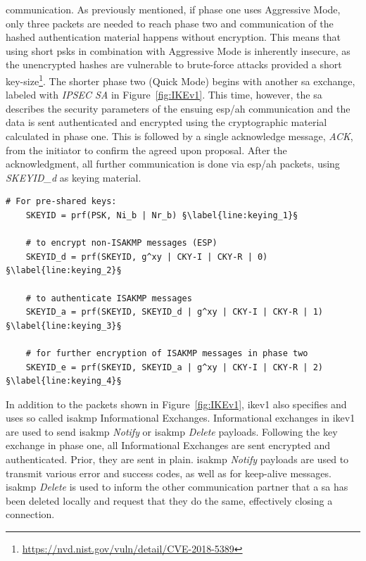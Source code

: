 communication. As previously mentioned, if phase one uses Aggressive Mode, only three packets are needed to reach phase two and communication of the hashed authentication material happens without encryption. This means that using short \acp{psk} in combination with Aggressive Mode is inherently insecure, as the unencrypted hashes are vulnerable to brute-force attacks provided a short key-size\footnote{\url{https://nvd.nist.gov/vuln/detail/CVE-2018-5389}}. The shorter phase two (Quick Mode) begins with another \ac{sa} exchange, labeled with \emph{IPSEC SA} in Figure~\ref{fig:IKEv1}. This time, however, the \ac{sa} describes the security parameters of the ensuing \ac{esp}/\ac{ah} communication and the data is sent authenticated and encrypted using the cryptographic material calculated in phase one. This is followed by a single acknowledge message, \emph{ACK}, from the initiator to confirm the agreed upon proposal. After the acknowledgment, all further communication is done via \ac{esp}/\ac{ah} packets, using \emph{SKEYID\_d} as keying material. \\

\begin{lstlisting}[float=ht, caption=IKE keying material construction., label=lst:keying, escapechar=§]
	# For pre-shared keys: 
	SKEYID = prf(PSK, Ni_b | Nr_b) §\label{line:keying_1}§
	
	# to encrypt non-ISAKMP messages (ESP)
	SKEYID_d = prf(SKEYID, g^xy | CKY-I | CKY-R | 0) §\label{line:keying_2}§
	
	# to authenticate ISAKMP messages
	SKEYID_a = prf(SKEYID, SKEYID_d | g^xy | CKY-I | CKY-R | 1) §\label{line:keying_3}§
	
	# for further encryption of ISAKMP messages in phase two
	SKEYID_e = prf(SKEYID, SKEYID_a | g^xy | CKY-I | CKY-R | 2) §\label{line:keying_4}§
\end{lstlisting}

\newpage
In addition to the packets shown in Figure~\ref{fig:IKEv1}, \ac{ike}v1 also specifies and uses so called \ac{isakmp} Informational Exchanges. Informational exchanges in \ac{ike}v1 are used to send \ac{isakmp} \emph{Notify} or \ac{isakmp} \emph{Delete} payloads. Following the key exchange in phase one, all Informational Exchanges are sent encrypted and authenticated. Prior, they are sent in plain. \ac{isakmp} \emph{Notify} payloads are used to transmit various error and success codes, as well as for keep-alive messages. \ac{isakmp} \emph{Delete} is used to inform the other communication partner that a \ac{sa} has been deleted locally and request that they do the same, effectively closing a connection. \\

